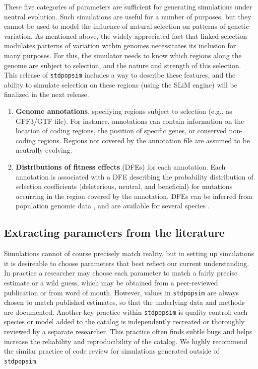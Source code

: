 \documentclass[hidelinks]{article}
\newcommand{\stdpopsim}{\texttt{stdpopsim}\xspace}
\begin{document}
These five categories of parameters are sufficient for generating simulations
under neutral evolution. Such simulations are useful for a number of purposes,
but they cannot be used to model the influence of natural selection on patterns of genetic variation.
As mentioned above, the widely appreciated fact that linked selection modulates
patterns of variation within genomes necessitates its inclusion for many purposes.
For this, the simulator needs to know which regions along the genome are subject to selection,
and the nature and strength of this selection.
This release of \stdpopsim includes a way to describe these features,
and the ability to simulate selection on these regions (using the SLiM engine)
will be finalized in the next release.

\begin{enumerate}
	\def\labelenumi{\arabic{enumi}.}
	\setcounter{enumi}{5}
	\item
	\textbf{Genome annotations}, specifying regions subject to selection (e.g., as GFF3/GTF file).
    For instance, annotations can contain information on the location of coding regions,
    the position of specific genes, or conserved non-coding regions.
    Regions not covered by the annotation file are assumed to be neutrally evolving.

	\item
	\textbf{Distributions of fitness effects} (DFEs) for each annotation.
    Each annotation is associated with a DFE describing
    the probability distribution of selection coefficients (deleterious, neutral, and beneficial)
    for mutations occurring in the region covered by the annotation.
    DFEs can be inferred from population genomic data \citep[reviewed in][]{Eyre-Walker2007},
    and are available for several species \citep[e.g.,][]{Ma2013, Huber2018}.
\end{enumerate}

\subsection*{Extracting parameters from the literature}

Simulations cannot of course precisely match reality, but in setting up simulations
it is desireable to choose parameters that best reflect our current understanding.
In practice a researcher may choose each parameter to match a fairly precise estimate or a wild guess,
which may be obtained from a peer-reviewed publication or from word of mouth.
However, values in \stdpopsim are always chosen to match published estimates,
so that the underlying data and methods are documented.
Another key practice within \stdpopsim is quality control:
each species or model added to the catalog is independently recreated or thoroughly reviewed by a separate researcher.
This practice often finds subtle bugs and helps increase the reliability and reproducibility of the catalog.
We highly recommend the similar practice of code review for simulations generated outside of \stdpopsim.
\end{document}
